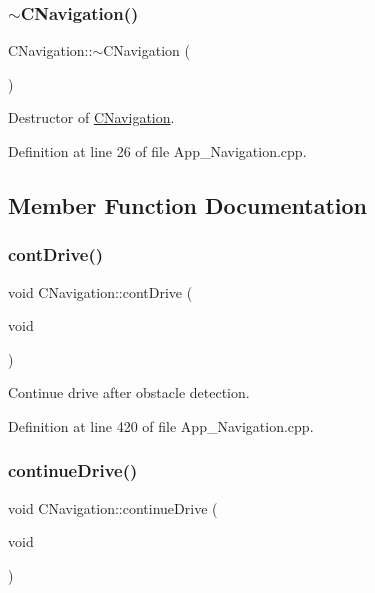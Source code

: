 \subsubsection{\texorpdfstring{$\sim$\+C\+Navigation()}{~CNavigation()}}
{\footnotesize\ttfamily C\+Navigation\+::$\sim$\+C\+Navigation (\begin{DoxyParamCaption}{ }\end{DoxyParamCaption})}



Destructor of \mbox{\hyperlink{class_c_navigation}{C\+Navigation}}. 



Definition at line 26 of file App\+\_\+\+Navigation.\+cpp.



\subsection{Member Function Documentation}
\mbox{\label{class_c_navigation_abc7e30f72ee2cb33be7b0949efe1cb18}} 
\subsubsection{\texorpdfstring{cont\+Drive()}{contDrive()}}
{\footnotesize\ttfamily void C\+Navigation\+::cont\+Drive (\begin{DoxyParamCaption}\item[{void}]{ }\end{DoxyParamCaption})\hspace{0.3cm}{\ttfamily [virtual]}}



Continue drive after obstacle detection. 



Definition at line 420 of file App\+\_\+\+Navigation.\+cpp.

\mbox{\label{class_c_navigation_ab3d29f3ab4a8a922f5af439f6d78aded}} 
\subsubsection{\texorpdfstring{continue\+Drive()}{continueDrive()}}
{\footnotesize\ttfamily void C\+Navigation\+::continue\+Drive (\begin{DoxyParamCaption}\item[{void}]{ }\end{DoxyParamCaption})\hspace{0.3cm}{\ttfamily [virtual]}}



